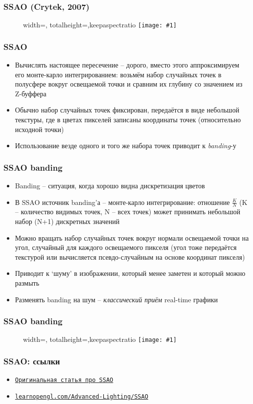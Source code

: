 \documentclass[10pt]{beamer}
\newcommand{\slideimage}[1]{
  \begin{figure}
    \begin{adjustbox}{width=\textwidth, totalheight=\textheight-2\baselineskip-2\baselineskip,keepaspectratio}
      \texttt{[image: \#1]}
    \end{adjustbox}
  \end{figure}
}
\begin{document}
\begin{frame}[fragile]
\frametitle{SSAO (Crytek, 2007)}
\slideimage{crysis-ao.jpg}
\end{frame}

\begin{frame}[fragile]
\frametitle{SSAO}
\begin{itemize}
\item Вычислять настоящее пересечение -- дорого, вместо этого аппроксимируем его монте-карло интегрированием: возьмём набор случайных точек в полусфере вокруг освещаемой точки и сравним их глубину со значением из Z-буффера
\pause
\item Обычно набор случайных точек фиксирован, передаётся в виде небольшой текстуры, где в цветах пикселей записаны координаты точек (относительно исходной точки)
\pause
\item Использование везде одного и того же набора точек приводит к \textit{banding}-у
\end{itemize}
\end{frame}

\begin{frame}[fragile]
\frametitle{SSAO banding}
\begin{itemize}
\item Banding -- ситуация, когда хорошо видна дискретизация цветов
\pause
\item В SSAO источник banding'а -- монте-карло интегрирование: отношение \begin{math}\frac{K}{N}\end{math} (K -- количество видимых точек, N -- всех точек) может принимать небольшой набор (N+1) дискретных значений
\pause
\item Можно вращать набор случайных точек вокруг нормали освещаемой точки на угол, случайный для каждого освещаемого пикселя (угол тоже передаётся текстурой или вычисляется псевдо-случайным на основе координат пикселя)
\pause
\item Приводит к `шуму' в изображении, который менее заметен и который можно размыть
\pause
\item Разменять banding на шум -- \textit{классический приём} real-time графики
\end{itemize}
\end{frame}

\begin{frame}[fragile]
\frametitle{SSAO banding}
\slideimage{ssao.jpg}
\end{frame}

\begin{frame}[fragile]
\frametitle{SSAO: ссылки}
\begin{itemize}
\item \href{https://artis.inrialpes.fr/Membres/Olivier.Hoel/ssao/nVidiaHSAO/ScreenSpaceAO.pdf}{\texttt{Оригинальная статья про SSAO}}
\item \href{https://learnopengl.com/Advanced-Lighting/SSAO}{\texttt{learnopengl.com/Advanced-Lighting/SSAO}}
\end{itemize}
\end{frame}
\end{document}
